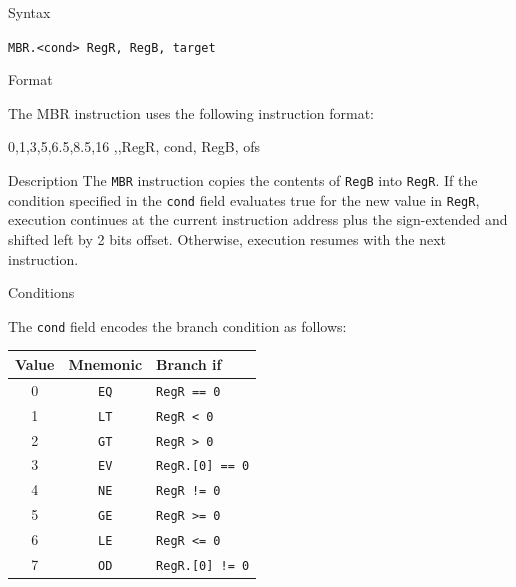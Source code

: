 %
%
\pagebreak
{}

\begin{iPageDescEntry}{Syntax}

	\texttt{MBR.<cond> RegR, RegB, target}
    
\end{iPageDescEntry}

\begin{iPageDescEntry}{Format}

The MBR instruction uses the following instruction format:
	
\begin{flushleft}
\drawInstrFormat
  	{0,1,3,5,6.5,8.5,16}
  	{\OpCodeGrpBR,\OpCodeMBR,RegR, cond, RegB, ofs }
\end{flushleft}
\end{iPageDescEntry}

\begin{iPageDescEntry}{Description}
The \texttt{MBR} instruction copies the contents of \texttt{RegB} into \texttt{RegR}.  If the condition specified in the \texttt{cond} field evaluates true for the new value in \texttt{RegR}, execution continues at the current instruction address plus the sign-extended and shifted left by 2 bits  offset. Otherwise, execution resumes with the next instruction.
\end{iPageDescEntry}

\begin{iPageDescEntry}{Conditions}

The \texttt{cond} field encodes the branch condition as follows:

\begin{flushleft}
\begin{tabular}{|c|c|l|}
\hline
\textbf{Value} & \textbf{Mnemonic} & \textbf{Branch if} \\ \hline
0 & \texttt{EQ} & \texttt{RegR == 0} \\ \hline
1 & \texttt{LT} & \texttt{RegR <  0}  \\ \hline
2 & \texttt{GT} & \texttt{RegR >  0} \\ \hline
3 & \texttt{EV} & \texttt{RegR.[0] == 0} \\ \hline
4 & \texttt{NE} & \texttt{RegR != 0} \\ \hline
5 & \texttt{GE} & \texttt{RegR >= 0} \\ \hline
6 & \texttt{LE} & \texttt{RegR <= 0}  \\ \hline
7 & \texttt{OD} & \texttt{RegR.[0] != 0} \\ \hline
\end{tabular}
\end{flushleft}

\end{iPageDescEntry}

